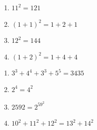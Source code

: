 \documentclass{article}
\begin{document}
\begin{minipage}{7cm}
	\begin{enumerate}[font=\sffamily\bfseries,label=A.\arabic*), series=Aes]
		\item $11^2=121$
		\item $(1+1)^2=1+2+1$
		\item $12^2=144$
		\item $(1+2)^2=1+4+4$
	\end{enumerate}
\end{minipage} \hfill \begin{minipage}{7cm}
\begin{enumerate}[label=I.\arabic*),resume*=Aes]
	\item $3^3 + 4^4 + 3^3 + 5^5 = 3435$
	\item $2^4 = 4^2$
	\item $2592=2^59^2$
	\item $10^2+11^2+12^2=13^2+14^2$
\end{enumerate}
\end{minipage}	
	
	
\end{document}
